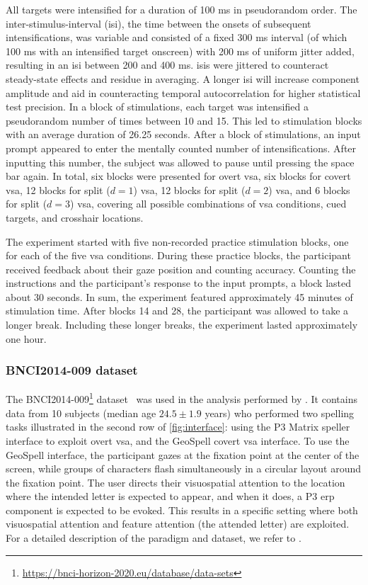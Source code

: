 All targets were intensified for a duration of 100 ms in pseudorandom order.
The inter-stimulus-interval (\ac{isi}), the time between the onsets of subsequent intensifications,
was variable and consisted of a fixed 300 ms interval (of which 100 ms with an intensified target onscreen)
with 200 ms of uniform jitter added, resulting in an \ac{isi}
between 200 and 400 ms.
\Acp{isi} were jittered to counteract steady-state effects and residue in averaging. A
longer \ac{isi} will increase component amplitude and aid in counteracting temporal
autocorrelation for higher statistical test precision.
In a block of stimulations, each target was intensified a pseudorandom number of times between 10 and 15.
This led to stimulation blocks with an average duration of 26.25 seconds. After a block of stimulations, an
input prompt appeared to enter the mentally counted number of intensifications.
After inputting this number, the subject was allowed to pause until pressing the space bar again.
In total, six blocks were presented for overt \ac{vsa}, six blocks for covert \ac{vsa}, 12 blocks for
split ($d=1$) \ac{vsa}, 12 blocks for split ($d=2$) \ac{vsa}, and 6 blocks for split
($d=3$) \ac{vsa}, covering all possible combinations of \ac{vsa} conditions, cued targets, and
crosshair locations.

The experiment started with five non-recorded practice stimulation blocks, one for
each of the five \ac{vsa} conditions.
During these practice blocks, the participant received feedback about their gaze
position and counting accuracy.
Counting the instructions and the participant's response to the
input prompts, a block lasted about 30 seconds. In sum, the experiment featured approximately 45 minutes of
stimulation time.
After blocks 14 and 28, the participant was allowed to take a longer break.
Including these longer breaks, the experiment lasted approximately one hour.

\subsubsection{BNCI2014-009 dataset}
The BNCI2014-009\footnote{\url{https://bnci-horizon-2020.eu/database/data-sets}}
dataset~\cite{Aloise2012a} was used in the analysis performed
by \cite{Arico2014}.
It contains data from 10 subjects (median age $24.5\pm1.9$
years) who performed two spelling tasks illustrated in the second row of
\cref{fig:interface}: using the P3 Matrix speller
interface to exploit overt \ac{vsa}, and the GeoSpell covert \ac{vsa} interface.
To use the GeoSpell interface, the participant gazes at the fixation point at the
center of the screen, while groups of characters flash simultaneously in a
circular layout around the fixation point.
The user directs their visuospatial attention to the location where the intended letter is expected
to appear, and when it does, a P3 \ac{erp} component is expected to be evoked.
This results in a specific setting where both visuospatial attention and
feature attention (the attended letter) are exploited.
For a detailed description of the paradigm and dataset, we refer
to \cite{Aloise2012a}.

